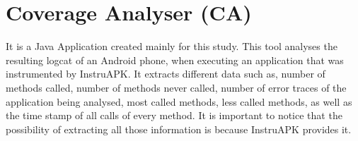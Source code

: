 \section{Coverage Analyser (CA)}
 It is a Java Application created mainly for this study. This tool analyses the resulting logcat of an Android phone, when executing an application that was instrumented by InstruAPK. It extracts different data such as, number of methods called, number of  methods never called, number of error traces of the application being analysed, most called methods, less called methods, as well as the time stamp of all calls of every method. It is important to notice that the possibility of extracting all those information is because InstruAPK provides it.

